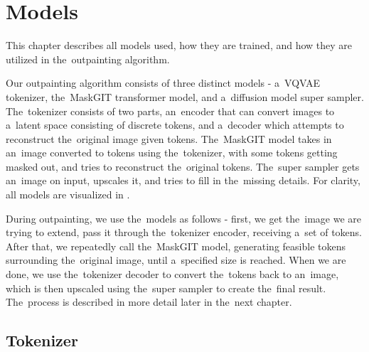 \chapter{Models} \label{models}


This chapter describes all models used, how they are trained, and how they are utilized in the~outpainting algorithm.

Our outpainting algorithm consists of three distinct models - a~VQVAE tokenizer, the~MaskGIT transformer model, and a~diffusion model super sampler. The~tokenizer consists of two parts, an~encoder that can convert images to a~latent space consisting of discrete tokens, and a~decoder which attempts to reconstruct the~original image given tokens. The~MaskGIT model takes in an~image converted to tokens using the~tokenizer, with some tokens getting masked out, and tries to reconstruct the~original tokens. The~super sampler gets an~image on input, upscales it, and tries to fill in the~missing details. For clarity, all models are visualized in .




During outpainting, we use the~models as follows - first, we get the~image we are trying to extend, pass it through the~tokenizer encoder, receiving a~set of tokens. After that, we repeatedly call the~MaskGIT model, generating feasible tokens surrounding the~original image, until a~specified size is reached. When we are done, we use the~tokenizer decoder to convert the~tokens back to an~image, which is then upscaled using the~super sampler to create the~final result. The~process is described in more detail later in the~next chapter.


\section{Tokenizer}

